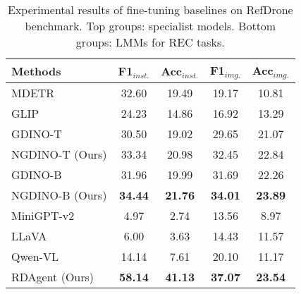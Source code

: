 \begin{table}[t]
\caption{Experimental results of fine-tuning baselines on RefDrone benchmark. Top groups: specialist models. Bottom groups: LMMs for REC tasks.}

\label{tab:finetune}
  \centering
\begin{adjustbox}{width=\linewidth}
  \begin{tabular}{l c  c c c }
    \toprule
    Methods & F1$_{inst.}$ & Acc$_{inst.}$ & F1$_{img.}$ & Acc$_{img.}$ \\
    \midrule 

MDETR~\cite{mdetr}  & 32.60 & 19.49 & 19.17 & 10.81 \\
GLIP~\cite{glip} & 24.23 & 14.86 & 16.92 & 13.29  \\
GDINO-T~\cite{gdino}  & 30.50 & 19.02 & 29.65 & 21.07 \\
NGDINO-T (Ours) &  33.34 & 20.98  & 32.45  & 22.84 \\
GDINO-B~\cite{gdino}  & 31.96 & 19.99 & 31.69 & 22.26 \\
NGDINO-B (Ours)&  \textbf{34.44} &\textbf{ 21.76 } & \textbf{34.01}  & \textbf{23.89 }\\

\midrule

MiniGPT-v2~\cite{chen2023minigpt}  & 4.97 & 2.74 & 13.56 & 8.97 \\
LLaVA~\cite{llava} & 6.00 & 3.63 & 14.43 & 11.57 \\
Qwen-VL~\cite{bai2023qwen} &  14.14 & 7.61 & 20.10 & 11.17 \\
RDAgent (Ours) & \textbf{ 58.14} & \textbf{41.13}  &\textbf{ 37.07}  & \textbf{23.54 }\\


  \bottomrule

\end{tabular}
\end{adjustbox}

\end{table}